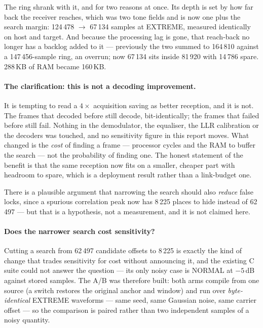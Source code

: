 The ring shrank with it, and for two reasons at once. Its depth is set by
how far back the receiver reaches, which was two tone fields and is now
one plus the search margin: 124\,478 $\rightarrow$ 67\,134 samples at
EXTREME, measured identically on host and target. And because the
processing lag is gone, that reach-back no longer has a backlog added to
it --- previously the two summed to 164\,810 against a 147\,456-sample
ring, an overrun; now 67\,134 sits inside 81\,920 with 14\,786 spare.
288\,KB of RAM became 160\,KB.

\paragraph{The clarification: this is not a decoding improvement.}
It is tempting to read a $4\times$ acquisition saving as better
reception, and it is not. The frames that decoded before still decode,
bit-identically; the frames that failed before still fail. Nothing in
the demodulator, the equaliser, the LLR calibration or the decoders was
touched, and no sensitivity figure in this report moves. What changed is
the \emph{cost} of finding a frame --- processor cycles and the RAM to
buffer the search --- not the probability of finding one. The honest
statement of the benefit is that the same reception now fits on a
smaller, cheaper part with headroom to spare, which is a deployment
result rather than a link-budget one.

There is a plausible argument that narrowing the search should also
\emph{reduce} false locks, since a spurious correlation peak now has
8\,225 places to hide instead of 62\,497 --- but that is a hypothesis,
not a measurement, and it is not claimed here.

\paragraph{Does the narrower search cost sensitivity?}
Cutting a search from 62\,497 candidate offsets to 8\,225 is exactly the
kind of change that trades sensitivity for cost without announcing it,
and the existing C suite could not answer the question --- its only
noisy case is NORMAL at $-5$\,dB against stored samples. The A/B was
therefore built: both arms compile from one source (a switch restores
the original anchor and window) and run over \emph{byte-identical}
EXTREME waveforms --- same seed, same Gaussian noise, same carrier
offset --- so the comparison is paired rather than two independent
samples of a noisy quantity.

